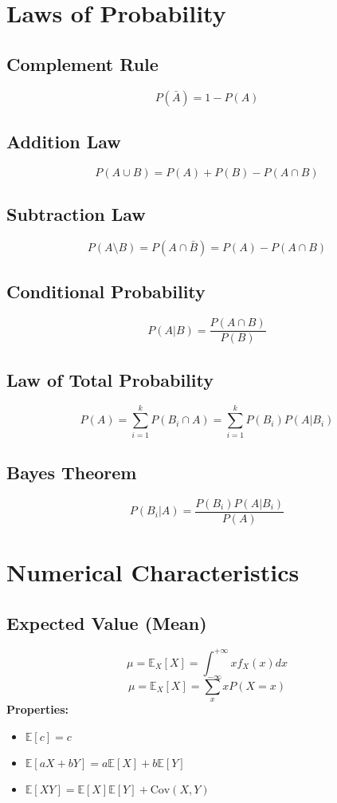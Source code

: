\documentclass{article}
\begin{document}
\newpage
\section{Laws of Probability}

\subsection{Complement Rule}
\[
    P(\bar{A}) = 1 - P(A)
\]

\subsection{Addition Law}
\[
    P(A \cup B) = P(A) + P(B) - P(A \cap B)
\]

\subsection{Subtraction Law}
\[
    P(A \setminus B) = P(A \cap \bar{B}) = P(A) - P(A \cap B)
\]

\subsection{Conditional Probability}
\[
    P(A|B) = \frac{P(A \cap B)}{P(B)}
\]

\subsection{Law of Total Probability}
\[
    P(A) = \sum_{i=1}^{k} P(B_i \cap A) = \sum_{i=1}^{k} P(B_i)P(A|B_i)
\]

\subsection{Bayes Theorem}
\[
    P(B_i|A) = \frac{P(B_i)P(A|B_i)}{P(A)}
\]

\newpage
\section{Numerical Characteristics}

\subsection{Expected Value (Mean)}
\[
    \mu = \mathbb{E}_X[X] = \int_{-\infty}^{+\infty} x f_X(x) dx
\]
\[
    \mu = \mathbb{E}_X[X] = \sum_{x} x P(X=x)
\]
\textbf{Properties:}
\begin{itemize}
    \item \( \mathbb{E}[c] = c \)
    \item \( \mathbb{E}[aX+bY] = a\mathbb{E}[X] + b\mathbb{E}[Y] \)
    \item \( \mathbb{E}[XY] = \mathbb{E}[X]\mathbb{E}[Y] + \text{Cov}(X,Y) \)
\end{itemize}
\end{document}
